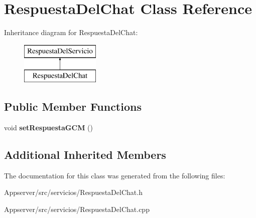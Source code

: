 \hypertarget{classRespuestaDelChat}{}\section{Respuesta\+Del\+Chat Class Reference}
\label{classRespuestaDelChat}
Inheritance diagram for Respuesta\+Del\+Chat\+:\begin{figure}[H]
\begin{center}
\leavevmode
\includegraphics[height=2.000000cm]{classRespuestaDelChat}
\end{center}
\end{figure}
\subsection*{Public Member Functions}
\begin{DoxyCompactItemize}
\item 
void {\bfseries set\+Respuesta\+G\+CM} ()\hypertarget{classRespuestaDelChat_a53a20f3049b1a7fa51a9a19500184810}{}\label{classRespuestaDelChat_a53a20f3049b1a7fa51a9a19500184810}

\end{DoxyCompactItemize}
\subsection*{Additional Inherited Members}


The documentation for this class was generated from the following files\+:\begin{DoxyCompactItemize}
\item 
Appserver/src/servicios/Respuesta\+Del\+Chat.\+h\item 
Appserver/src/servicios/Respuesta\+Del\+Chat.\+cpp\end{DoxyCompactItemize}
